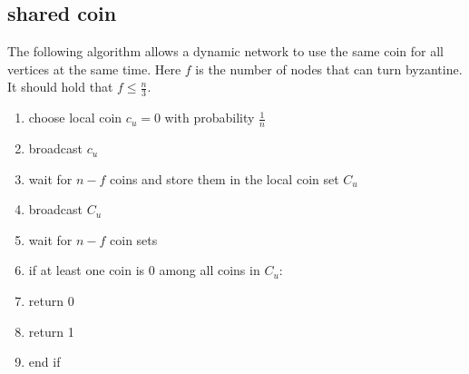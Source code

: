 \documentclass[a4paper, 12pt]{article}
\theoremstyle{plain}
\theoremstyle{definition}
\theoremstyle{lemma}
\theoremstyle{remark}
\theoremstyle{corollary}
\theoremstyle{example}
\begin{document}
	\subsection{shared coin}
	The following algorithm allows a dynamic network to use the same coin for all vertices at the same time. Here $f$ is the number of nodes that can turn byzantine. It should hold that $f \leq \frac{n}{3}$.
	\begin{enumerate}
		\item choose local coin $c_u = 0$ with probability $\frac{1}{n}$
		\item broadcast $c_u$
		\item wait for $n-f$ coins and store them in the local coin set $C_u$
		\item broadcast $C_u$
		\item wait for $n-f$ coin sets
		\item if at least one coin is 0 among all coins in $C_u$:
		\item return 0
		\item return 1
		\item end if
	\end{enumerate}
\end{document}
